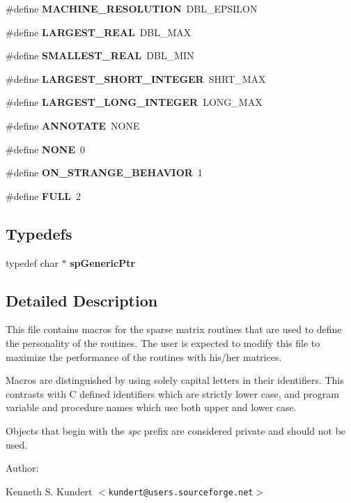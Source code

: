 \begin{CompactItemize}
\item 
\#define {\bf MACHINE\_\-RESOLUTION}\ DBL\_\-EPSILON
\item 
\#define {\bf LARGEST\_\-REAL}\ DBL\_\-MAX
\item 
\#define {\bf SMALLEST\_\-REAL}\ DBL\_\-MIN
\item 
\#define {\bf LARGEST\_\-SHORT\_\-INTEGER}\ SHRT\_\-MAX
\item 
\#define {\bf LARGEST\_\-LONG\_\-INTEGER}\ LONG\_\-MAX
\item 
\#define {\bf ANNOTATE}\ NONE
\item 
\#define {\bf NONE}\ 0
\item 
\#define {\bf ON\_\-STRANGE\_\-BEHAVIOR}\ 1
\item 
\#define {\bf FULL}\ 2
\end{CompactItemize}
\subsection*{Typedefs}
\begin{CompactItemize}
\item 
{}
typedef char $\ast$ {\bf sp\-Generic\-Ptr}\label{spConfig_8h_a49}

\end{CompactItemize}


\subsection{Detailed Description}


This file contains macros for the sparse matrix routines that are used to define the personality of the routines. The user is expected to modify this file to maximize the performance of the routines with his/her matrices.

Macros are distinguished by using solely capital letters in their identifiers. This contrasts with C defined identifiers which are strictly lower case, and program variable and procedure names which use both upper and lower case.

Objects that begin with the {\em spc} prefix are considered private and should not be used.

\begin{Desc}
\item[Author: ]\par
 Kenneth S. Kundert $<${\tt kundert@users.sourceforge.net}$>$\end{Desc}



